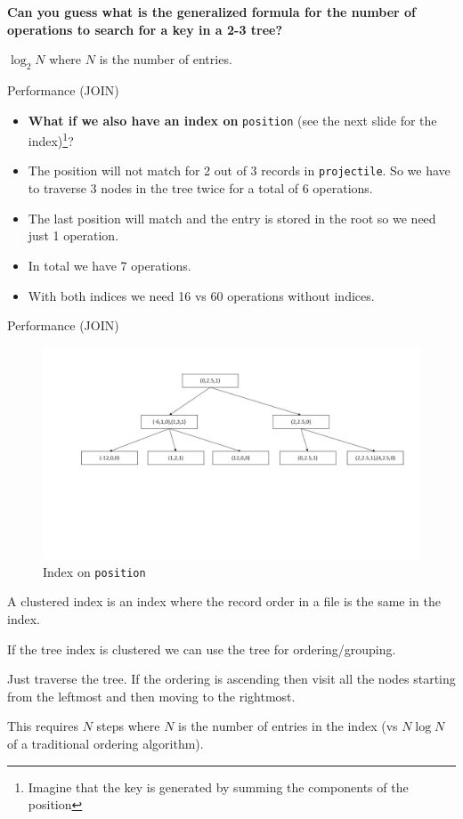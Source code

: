 \documentclass{beamer}
\begin{document}
\begin{slide}{
\item \textbf{Can you guess what is the generalized formula for the number of operations to search for a key in a 2-3 tree?}
\pause
\item $\log_{2} N$ where $N$ is the number of entries.
}\end{slide}



\begin{frame}{Performance (JOIN)}
\begin{itemize}
\item \textbf{What if we also have an index on} \texttt{position} (see the next slide for the index)\footnote{Imagine that the key is generated by summing the components of the position}?
\pause
\item The position will not match for 2 out of 3 records in \texttt{projectile}. So we have to traverse 3 nodes in the tree twice for a total of 6 operations.
\item The last position will match and the entry is stored in the root so we need just 1 operation.
\item In total we have 7 operations.
\item With both indices we need 16 vs 60 operations without indices.
\end{itemize}
\end{frame}

\begin{frame}{Performance (JOIN)}
\begin{figure}
\centering
\includegraphics[scale=0.3]{img/tree3}
\caption{Index on \texttt{position}}
\end{figure}
\end{frame}

\begin{slide}{
\item A clustered index is an index where the record order in a file is the same in the index.
\item If the tree index is clustered we can use the tree for ordering/grouping.
\item Just traverse the tree. If the ordering is ascending then visit all the nodes starting from the leftmost and then moving to the rightmost.
\item This requires $N$ steps where $N$ is the number of entries in the index (vs $N \log N$ of a traditional ordering algorithm).
}\end{slide}
\end{document}
